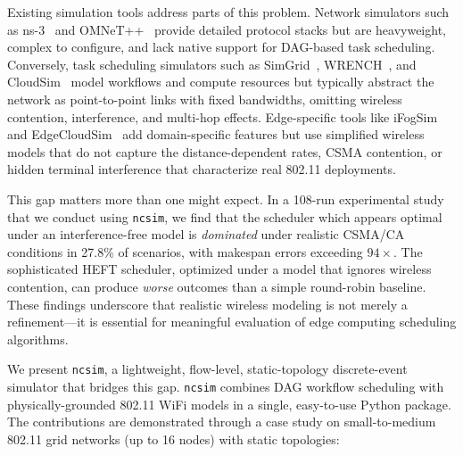 \documentclass[conference]{IEEEtran}
\newcommand{\ncsim}{\texttt{ncsim}}
\begin{document}
Existing simulation tools address parts of this problem.  Network simulators
such as ns-3~\cite{ns3} and OMNeT++~\cite{omnetpp} provide detailed protocol
stacks but are heavyweight, complex to configure, and lack native support for
DAG-based task scheduling.  Conversely, task scheduling simulators such as
SimGrid~\cite{simgrid}, WRENCH~\cite{wrench}, and CloudSim~\cite{cloudsim}
model workflows and compute resources but typically abstract the network as
point-to-point links with fixed bandwidths, omitting wireless contention,
interference, and multi-hop effects.  Edge-specific tools like
iFogSim~\cite{ifogsim} and EdgeCloudSim~\cite{edgecloudsim} add
domain-specific features but use simplified wireless models that do not
capture the distance-dependent rates, CSMA contention, or hidden terminal
interference that characterize real 802.11 deployments.

This gap matters more than one might expect.  In a 108-run experimental
study that we conduct using \ncsim{}, we find that the scheduler which
appears optimal under an interference-free model is \emph{dominated} under
realistic CSMA/CA conditions in 27.8\% of scenarios, with makespan errors
exceeding $94\times$.  The sophisticated HEFT scheduler, optimized under
a model that ignores wireless contention, can produce \emph{worse} outcomes
than a simple round-robin baseline.  These findings underscore that realistic
wireless modeling is not merely a refinement---it is essential for
meaningful evaluation of edge computing scheduling algorithms.

We present \ncsim{}, a lightweight, flow-level, static-topology
discrete-event simulator that bridges this gap.  \ncsim{} combines DAG
workflow scheduling with physically-grounded 802.11 WiFi models in a
single, easy-to-use Python package.  The contributions are demonstrated
through a case study on small-to-medium 802.11 grid networks (up to 16
nodes) with static topologies:
\end{document}
